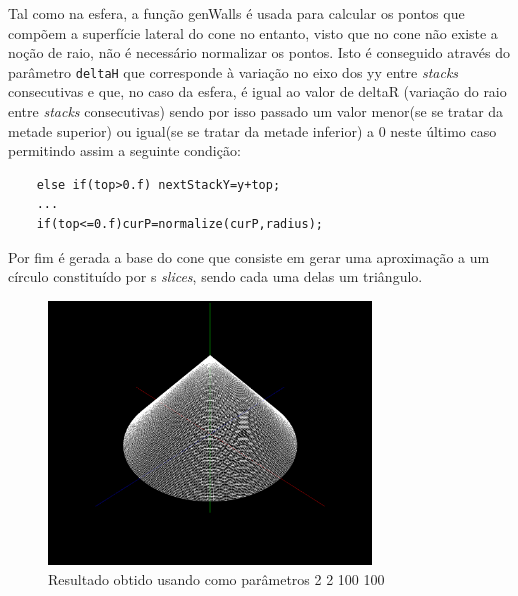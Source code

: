 \documentclass{article}
\begin{document}
Tal como na esfera, a função genWalls é usada para calcular os pontos que compõem a superfície lateral do cone no entanto, visto que no cone não existe a noção de raio, não é necessário normalizar os pontos. Isto é conseguido através do parâmetro \texttt{deltaH} que corresponde à variação no eixo dos yy entre \textit{stacks} consecutivas e que, no caso da esfera, é igual ao valor de deltaR (variação do raio entre \textit{stacks} consecutivas) sendo por isso passado um valor menor(se se tratar da metade superior) ou igual(se se tratar da metade inferior) a 0 neste último caso permitindo assim a seguinte condição:

\begin{Verbatim}
    else if(top>0.f) nextStackY=y+top;
    ...
    if(top<=0.f)curP=normalize(curP,radius);
\end{Verbatim}

Por fim é gerada a base do cone que consiste em gerar uma aproximação a um círculo constituído por s \textit{slices}, sendo cada uma delas um triângulo.


\begin{figure}[H]
    \centering
    \includegraphics[height=7cm]{coneFinal.png}
    \caption{Resultado obtido usando como parâmetros 2 2 100 100} 
\end{figure}

\newpage
\end{document}
